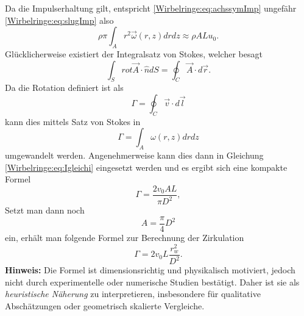Da die Impulserhaltung gilt, entspricht \eqref{Wirbelringe:eq:achssymImp} ungefähr \eqref{Wirbelringe:eq:slugImp} also
\begin{equation}
    \rho\pi\int_{A}r^2\vec{\omega}(r,z)drdz
    \approx
    \rho ALu_0
    \label{Wirbelringe:eq:Igleichi}.
\end{equation}
Glücklicherweise existiert der Integralsatz von Stokes, welcher besagt
\begin{equation*}
    \int_{S}rot\vec{A}\cdot\hat{n}dS 
    =
    \oint_{C}\vec{A}\cdot d\vec{r}.
\end{equation*}
Da die Rotation definiert ist als 
\begin{equation*}
    \Gamma
    =
    \oint_{C}\vec{v}\cdot d\vec{l}
\end{equation*}
kann dies mittels Satz von Stokes in
\begin{equation*}
    \Gamma
    =
    \int_{A}\omega(r,z)drdz
\end{equation*}
umgewandelt werden.
Angenehmerweise kann dies dann in Gleichung \eqref{Wirbelringe:eq:Igleichi} eingesetzt werden und es ergibt sich eine kompakte Formel
\begin{equation*}
    \Gamma
    =
    \frac{2v_0AL}{\pi D^2},
\end{equation*}
Setzt man dann noch 
\begin{equation*}
    A
    =
    \frac{\pi}{4} D^2
\end{equation*}
ein, erhält man folgende Formel zur Berechnung der Zirkulation
\begin{equation*}
    \label{Wirbelringe:eq:naeherungZirkulation}
    \Gamma
    =
    2v_0L\frac{r_w^2}{D^2}.
\end{equation*}
\textbf{Hinweis:}
Die Formel ist dimensionsrichtig und physikalisch motiviert, jedoch nicht durch experimentelle oder numerische Studien bestätigt.
Daher ist sie als \emph{heuristische Näherung} zu interpretieren, insbesondere für qualitative Abschätzungen oder geometrisch skalierte Vergleiche.